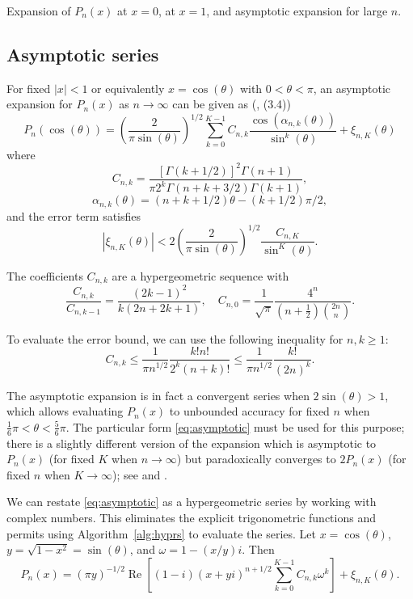 \documentclass[11pt,a4paper]{article}
\begin{document}
Expansion of $P_n(x)$ at $x = 0$, at $x = 1$, and
asymptotic expansion for large $n$.

\subsection{Asymptotic series}

For fixed $|x| < 1$ or equivalently $x = \cos(\theta)$ with $0 < \theta < \pi$,
an asymptotic expansion for $P_n(x)$ as $n \to \infty$
can be given as (\cite{Bogaert2012}, (3.4))
\begin{equation}
\label{eq:asymptotic}
P_n(\cos(\theta)) = \left(\frac{2}{\pi \sin(\theta)}\right)^{1/2}
\sum_{k=0}^{K-1} C_{n,k} \frac{\cos(\alpha_{n,k}(\theta))}{\sin^k(\theta)}
+ \xi_{n,K}(\theta)
\end{equation}
where
\begin{equation}
C_{n,k} = \frac{[\Gamma(k+1/2)]^2 \Gamma(n+1)}{\pi 2^k \Gamma(n+k+3/2) \Gamma(k+1)},
\end{equation}
\begin{equation}
\alpha_{n,k}(\theta) = (n+k+1/2) \theta - (k+1/2) \pi / 2,
\end{equation}
and the error term satisfies
\begin{equation}
|\xi_{n,K}(\theta)| < 2 \left(\frac{2}{\pi \sin(\theta)}\right)^{1/2} \frac{C_{n,K}}{\sin^K(\theta)}.
\end{equation}

The coefficients $C_{n,k}$ are a hypergeometric sequence with
$$\frac{C_{n,k}}{C_{n,k-1}} = \frac{(2k-1)^2}{k (2n+2k+1)}, \quad C_{n,0} = \frac{1}{\sqrt{\pi}} \frac{4^n}{(n+\tfrac{1}{2}) {2n \choose n}}.$$

To evaluate the error bound, we can use the following inequality for $n, k \ge 1$:
$$C_{n,k} \le \frac{1}{\pi n^{1/2}} \frac{k! n!}{2^k (n+k)!} \le \frac{1}{\pi n^{1/2}} \frac{k!}{(2n)^k}.$$

The asymptotic expansion is in fact a convergent series
when $2 \sin(\theta) > 1$, which allows evaluating $P_n(x)$ to unbounded
accuracy for fixed $n$ when $\tfrac{1}{6}\pi < \theta < \tfrac{5}{6} \pi$.
The particular form \eqref{eq:asymptotic}
must be used for this purpose; there is a slightly different version of the expansion
which is asymptotic to $P_n(x)$ (for fixed $K$ when $n \to \infty$)
but paradoxically
converges to $2 P_n(x)$ (for fixed $n$ when $K \to \infty$); see \cite{Olver1997} and \cite{Olver2010}.

We can restate \eqref{eq:asymptotic} as a hypergeometric series
by working with complex numbers. This eliminates the explicit trigonometric
functions and permits using Algorithm~\ref{alg:hyprs} to evaluate the series.
Let $x = \cos(\theta)$, $y = \sqrt{1-x^2} = \sin(\theta)$,
and $\omega = 1 - (x/y) i$. Then
\begin{equation}
\label{eq:asymptoticcomplex}
P_n(x) = (\pi y)^{-1/2} \operatorname{Re}\left[
(1-i) (x+y i)^{n+1/2}
\sum_{k=0}^{K-1} C_{n,k} \omega^k\right] + \xi_{n,K}(\theta).
\end{equation}
\end{document}
